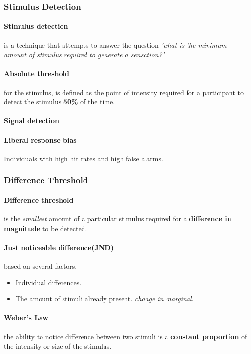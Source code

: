 \documentclass{article}
\begin{document}
	\subsubsection{Stimulus Detection}
	\paragraph{Stimulus detection} is a technique that attempts to answer the question \emph{'what is the minimum amount of stimulus required to generate a sensation?'}
	\paragraph{Absolute threshold} for the stimulus, is defined as the point of intensity required for a participant to detect the stimulus \textbf{50\%} of the time.
	\paragraph{Signal detection}
	\paragraph{Liberal response bias} Individuals with high hit rates and high false alarms.
	\subsubsection{Difference Threshold}
	\paragraph{Difference threshold} is the \emph{smallest} amount of a particular stimulus required for a \textbf{difference in magnitude} to be detected.
	\paragraph{Just noticeable difference(JND)} based on several factors.
	\begin{itemize}
		\item Individual differences.
		\item The amount of stimuli already present. \emph{change in marginal}.
	\end{itemize}
	\paragraph{Weber's Law} the ability to notice difference between two stimuli is a \textbf{constant proportion} of the intensity or size of the stimulus.
\end{document}
